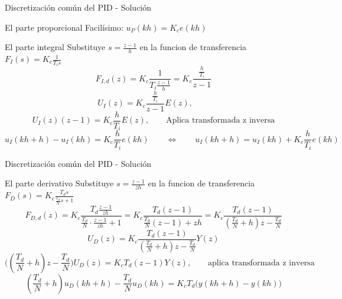 \documentclass[presentation,aspectratio=1610]{beamer}
\begin{document}
\begin{frame}[label={sec:org95130b5}]{Discretización común del PID - Solución}
\begin{block}{El parte proporcional}
Facilísimo: \(u_P(kh) = K_c e(kh)\)
\end{block}
\begin{block}{El parte integral}
Substituye \(s = \frac{z-1}{h}\) en la funcion de transferencia \(F_I(s) = K_c \frac{1}{T_i s}\)
\[ F_{I,d}(z) = K_c\frac{1}{T_i \frac{z-1}{h}} = K_c \frac{\frac{h}{T_i}}{z-1}\]
\[U_I(z) = K_c \frac{\frac{h}{T_i}}{z-1} E(z), \qquad \text{}\]
\[U_I(z)(z-1) = K_c \frac{h}{T_i} E(z), \qquad \text{Aplica transformada z inversa}\]
\[ u_I(kh+h) - u_I(kh) = K_c \frac{h}{T_i} e(kh) \qquad \Leftrightarrow \qquad u_I(kh+h) = u_I(kh) + K_c\frac{h}{T_i} e(kh)\]
\end{block}
\end{frame}

\begin{frame}[label={sec:org35f72c2}]{Discretización común del PID - Solución}
\begin{block}{El parte derivativo}
Substituye \(s = \frac{z-1}{zh}\) en la funcion de transferencia \(F_D(s) = K_c \frac{T_d s}{\frac{T_d}{N} s + 1}\)
\[ F_{D,d}(z) = K_c\frac{T_d \frac{z-1}{zh}}{\frac{T_d}{N}\cdot\frac{z-1}{zh}+1} 
         = K_c \frac{T_d(z-1)}{\frac{T_d}{N}(z-1) + zh} 
= K_c \frac{T_d(z-1)}{(\frac{T_d}{N}+h)z -\frac{T_d}{N}} \]
\[ U_D(z) = K_c \frac{T_d(z-1)}{(\frac{T_d}{N}+h)z -\frac{T_d}{N}} Y(z)\]
\[ \Big((\frac{T_d}{N}+h)z -\frac{T_d}{N}\Big) U_D(z) = K_cT_d(z-1) Y(z), \qquad \text{aplica transformada z inversa} \]
\[ (\frac{T_d}{N}+h)u_D(kh+h) -\frac{T_d}{N}u_D(kh) = K_cT_d\big(y(kh+h) - y(kh)\big)\]
\end{block}
\end{frame}
\end{document}
